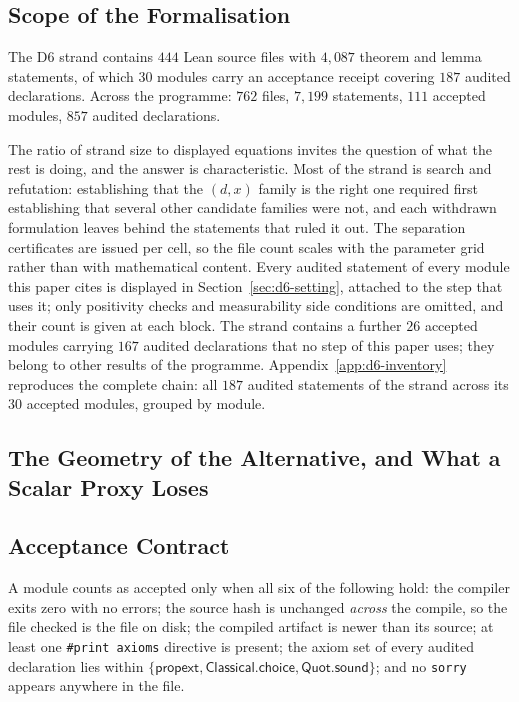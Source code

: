 \documentclass[conference]{IEEEtran}
\theoremstyle{definition}
\begin{document}
\subsection{Scope of the Formalisation}

The D6 strand contains $444$ Lean source files with $4{,}087$ theorem and lemma statements,
of which $30$ modules carry an acceptance receipt covering $187$ audited declarations. Across
the programme: $762$ files, $7{,}199$ statements, $111$ accepted modules, $857$ audited
declarations.

The ratio of strand size to displayed equations invites the question of what the rest is doing,
and the answer is characteristic. Most of the strand is search and refutation: establishing
that the $(d,x)$ family is the right one required first establishing that several other
candidate families were not, and each withdrawn formulation leaves behind the statements that
ruled it out. The separation certificates are issued per cell, so the file count scales with
the parameter grid rather than with mathematical content.
Every audited statement of every module this paper cites is displayed in Section~\ref{sec:d6-setting}, attached to the step that uses it; only positivity checks and measurability side conditions are omitted, and their count is given at each block. The strand contains a further $26$ accepted modules carrying $167$ audited declarations that no step of this paper uses; they belong to other results of the programme. Appendix~\ref{app:d6-inventory} reproduces the complete chain: all $187$ audited statements of the strand across its $30$ accepted modules, grouped by module.


\subsection{The Geometry of the Alternative, and What a Scalar Proxy Loses}
\label{sec:fn-verification}

\subsection{Acceptance Contract}

A module counts as accepted only when all six of the following hold: the compiler exits zero
with no errors; the source hash is unchanged \emph{across} the compile, so the file checked is
the file on disk; the compiled artifact is newer than its source; at least one
\texttt{\#print axioms} directive is present; the axiom set of every audited declaration lies
within $\{\textsf{propext},\textsf{Classical.choice},\textsf{Quot.sound}\}$; and no
\texttt{sorry} appears anywhere in the file.
\end{document}
